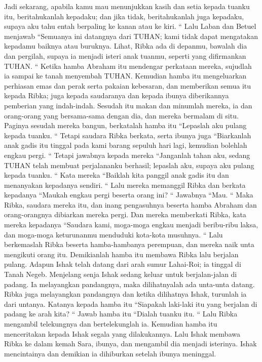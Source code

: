 \begin{biblechapter}
\verse Jadi sekarang, apabila kamu mau menunjukkan kasih dan setia kepada tuanku itu, beritahukanlah kepadaku; dan jika tidak, beritahukanlah juga kepadaku, supaya aku tahu entah berpaling ke kanan atau ke kiri. “
\verse Lalu Laban dan Betuel menjawab “Semuanya ini datangnya dari TUHAN; kami tidak dapat mengatakan kepadamu baiknya atau buruknya.
\verse Lihat, Ribka ada di depanmu, bawalah dia dan pergilah, supaya ia menjadi isteri anak tuanmu, seperti yang difirmankan TUHAN. “
\verse Ketika hamba Abraham itu mendengar perkataan mereka, sujudlah ia sampai ke tanah menyembah TUHAN.
\verse Kemudian hamba itu mengeluarkan perhiasan emas dan perak serta pakaian kebesaran, dan memberikan semua itu kepada Ribka; juga kepada saudaranya dan kepada ibunya diberikannya pemberian yang indah-indah.
\verse Sesudah itu makan dan minumlah mereka, ia dan orang-orang yang bersama-sama dengan dia, dan mereka bermalam di situ. Paginya sesudah mereka bangun, berkatalah hamba itu “Lepaslah aku pulang kepada tuanku. “
\verse Tetapi saudara Ribka berkata, serta ibunya juga “Biarkanlah anak gadis itu tinggal pada kami barang sepuluh hari lagi, kemudian bolehlah engkau pergi. “
\verse Tetapi jawabnya kepada mereka “Janganlah tahan aku, sedang TUHAN telah membuat perjalananku berhasil; lepaslah aku, supaya aku pulang kepada tuanku. “
\verse Kata mereka “Baiklah kita panggil anak gadis itu dan menanyakan kepadanya sendiri. “
\verse Lalu mereka memanggil Ribka dan berkata kepadanya “Maukah engkau pergi beserta orang ini? “ Jawabnya “Mau. “
\verse Maka Ribka, saudara mereka itu, dan inang pengasuhnya beserta hamba Abraham dan orang-orangnya dibiarkan mereka pergi.
\verse Dan mereka memberkati Ribka, kata mereka kepadanya “Saudara kami, moga-moga engkau menjadi beribu-ribu laksa, dan moga-moga keturunanmu menduduki kota-kota musuhnya. “
\verse Lalu berkemaslah Ribka beserta hamba-hambanya perempuan, dan mereka naik unta mengikuti orang itu. Demikianlah hamba itu membawa Ribka lalu berjalan pulang.
\verse Adapun Ishak telah datang dari arah sumur Lahai-Roi; ia tinggal di Tanah Negeb.
\verse Menjelang senja Ishak sedang keluar untuk berjalan-jalan di padang. Ia melayangkan pandangnya, maka dilihatnyalah ada unta-unta datang.
\verse Ribka juga melayangkan pandangnya dan ketika dilihatnya Ishak, turunlah ia dari untanya.
\verse Katanya kepada hamba itu “Siapakah laki-laki itu yang berjalan di padang ke arah kita? “ Jawab hamba itu “Dialah tuanku itu. “ Lalu Ribka mengambil telekungnya dan bertelekunglah ia.
\verse Kemudian hamba itu menceritakan kepada Ishak segala yang dilakukannya.
\verse Lalu Ishak membawa Ribka ke dalam kemah Sara, ibunya, dan mengambil dia menjadi isterinya. Ishak mencintainya dan demikian ia dihiburkan setelah ibunya meninggal.
\end{biblechapter}

